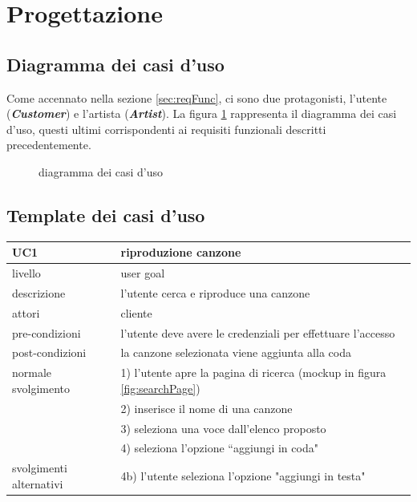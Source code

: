 \documentclass{article}
\begin{document}
  \section{Progettazione}

  \subsection{Diagramma dei casi d'uso}

  Come accennato nella sezione \ref{sec:reqFunc}, ci sono due protagonisti, l'utente (\textbf{\textit{Customer}}) e l'artista (\textbf{\textit{Artist}}). La figura \ref{fig:useCaseDiagram} rappresenta il diagramma dei casi d'uso, questi ultimi corrispondenti ai requisiti funzionali descritti precedentemente.

  \begin{figure}[H]
    \centering
    
    \caption{diagramma dei casi d'uso}
    \label{fig:useCaseDiagram}
  \end{figure}



  \subsection{Template dei casi d'uso}

  \begin{table}[H]
    \centering
    \begin{tabular}{|l|l|}
      \hline
      \textbf{UC1} & \textbf{riproduzione canzone}\\
      \hline
      livello & user goal\\
      \hline
      descrizione & l'utente cerca e riproduce una canzone\\
      \hline
      attori & cliente\\
      \hline
      pre-condizioni & l'utente deve avere le credenziali per effettuare l'accesso\\
      \hline
      post-condizioni & la canzone selezionata viene aggiunta alla coda\\
      \hline
      normale svolgimento & 1) l'utente apre la pagina di ricerca (mockup in figura \ref{fig:searchPage})\\
      & 2) inserisce il nome di una canzone\\
      & 3) seleziona una voce dall'elenco proposto\\
      & 4) seleziona l'opzione ``aggiungi in coda"

      \\
      \hline
      svolgimenti alternativi & 4b) l'utente seleziona l'opzione "aggiungi in testa"\\
      \hline
    \end{tabular}
    \label{tab:uct1}
  \end{table}
\end{document}
